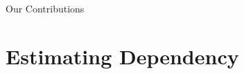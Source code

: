 \documentclass[16pt,usenames,dvipsnames, notheorems]{beamer}
\theoremstyle{definition}
\theoremstyle{example}
\theoremstyle{plain}
\begin{document}
\begin{frame}{Our Contributions}
\end{frame}

\section{Estimating Dependency}
\end{document}
